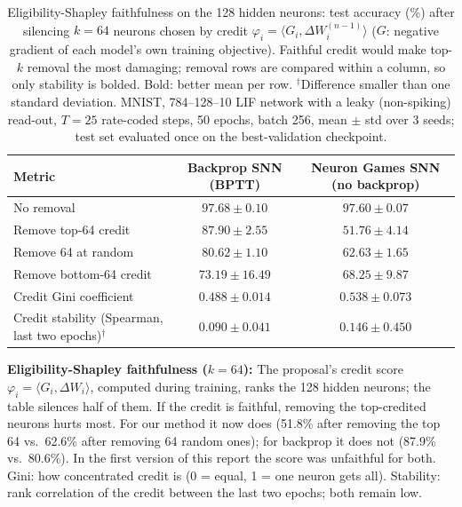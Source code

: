 \documentclass{article}
\begin{document}
\begin{table}[H]
\centering
\small
\caption{Eligibility-Shapley faithfulness on the 128 hidden neurons: test accuracy (\%) after silencing $k=64$ neurons chosen by credit $\varphi_i = \langle G_i, \Delta W_i^{(n-1)} \rangle$ ($G$: negative gradient of each model's own training objective). Faithful credit would make top-$k$ removal the most damaging; removal rows are compared within a column, so only stability is bolded. Bold: better mean per row. $^\dagger$Difference smaller than one standard deviation. MNIST, 784--128--10 LIF network with a leaky (non-spiking) read-out, $T=25$ rate-coded steps, 50 epochs, batch 256, mean $\pm$ std over 3 seeds; test set evaluated once on the best-validation checkpoint.}
\label{tab:t1-explain}
\begin{tabular}{lcc}
\toprule
Metric & Backprop SNN (BPTT) & Neuron Games SNN (no backprop) \\
\midrule
No removal & $97.68 \pm 0.10$ & $97.60 \pm 0.07$ \\
Remove top-64 credit & $87.90 \pm 2.55$ & $51.76 \pm 4.14$ \\
Remove 64 at random & $80.62 \pm 1.10$ & $62.63 \pm 1.65$ \\
Remove bottom-64 credit & $73.19 \pm 16.49$ & $68.25 \pm 9.87$ \\
\midrule
Credit Gini coefficient & $0.488 \pm 0.014$ & $0.538 \pm 0.073$ \\
Credit stability (Spearman, last two epochs)$^\dagger$ & $0.090 \pm 0.041$ & $\boldsymbol{0.146 \pm 0.450}$ \\
\bottomrule
\end{tabular}
\end{table}

{\small
\noindent\textbf{Eligibility-Shapley faithfulness ($k=64$):} The proposal's credit score $\varphi_i = \langle G_i,
\Delta W_i\rangle$, computed during training, ranks the 128 hidden neurons; the table silences half of them. If the
credit is faithful, removing the top-credited neurons hurts most. For our method it now does (51.8\% after removing
the top 64 vs.\ 62.6\% after removing 64 random ones); for backprop it does not (87.9\% vs.\ 80.6\%). In the first
version of this report the score was unfaithful for both. Gini: how concentrated credit is (0 = equal, 1 = one
neuron gets all). Stability: rank correlation of the credit between the last two epochs; both remain low.
}
\end{document}
